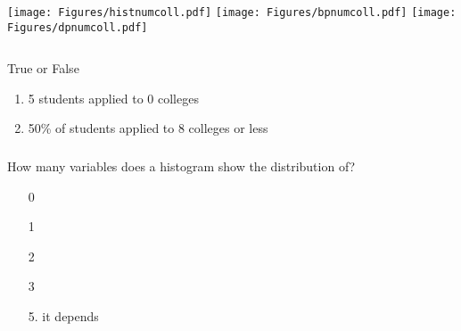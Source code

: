 \begin{frame}[fragile]
\frametitle{\grp}
\begin{columns}
\texttt{[image: Figures/histnumcoll.pdf]}
\texttt{[image: Figures/bpnumcoll.pdf]}
\texttt{[image: Figures/dpnumcoll.pdf]}
\end{columns}
\begin{clicker}{True or False}
\begin{enumerate}
\item 5 students applied to 0 colleges
\item 50\% of students applied to 8 colleges or less
\end{enumerate}
\end{clicker}
\vskip50pt
\end{frame}


\begin{frame}
\frametitle{\grp}
\begin{clicker}{How many variables does a histogram show the distribution of?}
\begin{enumerate}
\item[0]
\item[1]
\item[2]
\item[3]
\item[5.] it depends
\end{enumerate}
\end{clicker}
\end{frame}


